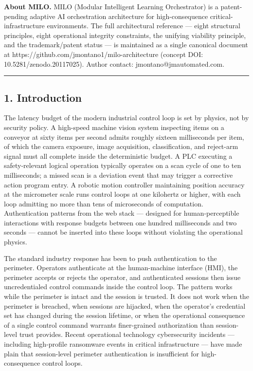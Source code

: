\textbf{About MILO.} MILO (Modular Intelligent Learning Orchestrator) is
a patent-pending adaptive AI orchestration architecture for
high-consequence critical-infrastructure environments. The full
architectural reference --- eight structural principles, eight
operational integrity constraints, the unifying viability principle, and
the trademark/patent status --- is maintained as a single canonical
document at https://github.com/jmontano1/milo-architecture (concept DOI:
10.5281/zenodo.20117025). Author contact: jmontano@jmautomated.com.

\begin{center}\rule{0.5\linewidth}{0.5pt}\end{center}

\subsection{1. Introduction}\label{introduction}

The latency budget of the modern industrial control loop is set by
physics, not by security policy. A high-speed machine vision system
inspecting items on a conveyor at sixty items per second admits roughly
sixteen milliseconds per item, of which the camera exposure, image
acquisition, classification, and reject-arm signal must all complete
inside the deterministic budget. A PLC executing a safety-relevant
logical operation typically operates on a scan cycle of one to ten
milliseconds; a missed scan is a deviation event that may trigger a
corrective action program entry. A robotic motion controller maintaining
position accuracy at the micrometer scale runs control loops at one
kilohertz or higher, with each loop admitting no more than tens of
microseconds of computation. Authentication patterns from the web stack
--- designed for human-perceptible interactions with response budgets
between one hundred milliseconds and two seconds --- cannot be inserted
into these loops without violating the operational physics.

The standard industry response has been to push authentication to the
perimeter. Operators authenticate at the human-machine interface (HMI),
the perimeter accepts or rejects the operator, and authenticated
sessions then issue uncredentialed control commands inside the control
loop. The pattern works while the perimeter is intact and the session is
trusted. It does not work when the perimeter is breached, when sessions
are hijacked, when the operator's credential set has changed during the
session lifetime, or when the operational consequence of a single
control command warrants finer-grained authorization than session-level
trust provides. Recent operational technology cybersecurity incidents
--- including high-profile ransomware events in critical infrastructure
--- have made plain that session-level perimeter authentication is
insufficient for high-consequence control loops.

